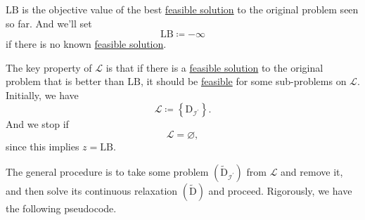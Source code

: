\begin{note}
	\(\mathrm{LB} \) is the objective value of the best \hyperref[def:feasible-solution]{feasible solution} to the original problem seen so far. And we'll set
	\[
		\mathrm{LB} \coloneqq  -\infty
	\]
	if there is no known \hyperref[def:feasible-solution]{feasible solution}.
\end{note}
\begin{remark}
	The key property of \(\mathcal{L} \) is that if there is a \hyperref[def:feasible-solution]{feasible solution} to the original problem that is better than \(\mathrm{LB} \), it should be \hyperref[def:feasible-solution]{feasible} for some sub-problems on \(\mathcal{L} \). Initially, we have
	\[
		\mathcal{L} \coloneqq \left\{\mathrm{D} _{\mathcal{I}^\prime }\right\}.
	\]
	And we stop if
	\[
		\mathcal{L} = \varnothing,
	\]
	since this implies \(z = \mathrm{LB} \).
\end{remark}

The general procedure is to take some problem \((\widetilde{\mathrm{D}}_{\mathcal{I}^\prime })\) from \(\mathcal{L}\) and remove it, and then solve its continuous relaxation \((\widetilde{\mathrm{D}})\) and proceed. Rigorously, we have the following pseudocode.

